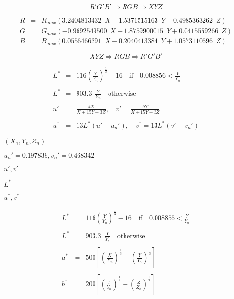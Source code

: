 \documentclass{article}
\begin{document}
\[ R'G'B' \Rightarrow RGB \Rightarrow XYZ \]
\pagebreak

\[ \begin{array}{rcl} R & = & R_{max} (3.2404813432\enspace X - 1.5371515163\enspace Y - 0.4985363262\enspace Z) \\ G & = & G_{max} (-0.9692549500\enspace X + 1.8759900015\enspace Y + 0.0415559266\enspace Z) \\ B & = & B_{max} (0.0556466391\enspace X - 0.2040413384\enspace Y + 1.0573110696\enspace Z) \end{array} \]
\pagebreak

\[ XYZ \Rightarrow RGB \Rightarrow R'G'B' \]
\pagebreak

\[ \begin{array}{rcl} L^{*} & = & 116 \left( \frac{Y}{Y_n} \right)^\frac{1}{3}-16 \quad \mbox{if} \quad 0.008856 < \frac{Y}{Y_n}\\ & & \\ L^{*} & = & 903.3\enspace \frac{Y}{Y_n} \quad \mbox{otherwise} \\ & & \\ u' & = & \frac{4 X}{X+15 Y + 3 Z}, \quad v' = \frac{9 Y}{X+15 Y + 3 Z}\\ & & \\ u^{*} & = & 13 L^{*} (u' - u_n'), \quad v^{*} = 13 L^{*} (v' - v_n') \end{array} \]
\pagebreak

$(X_n, Y_n, Z_n)$
\pagebreak

$u_n' = 0.197839, v_n'=0.468342$
\pagebreak

$u', v'$
\pagebreak

$L^{*}$
\pagebreak

$u^{*}, v^{*}$
\pagebreak

\[ \begin{array}{rcl} L^{*} & = & 116 \left( \frac{Y}{Y_n} \right)^\frac{1}{3}-16 \quad \mbox{if} \quad 0.008856 < \frac{Y}{Y_n}\\ & & \\ L^{*} & = & 903.3\enspace \frac{Y}{Y_n} \quad \mbox{otherwise} \\ & & \\ a^{*} & = & 500 \left[ \left( \frac{X}{X_n} \right)^\frac{1}{3} - \left( \frac{Y}{Y_n} \right)^\frac{1}{3} \right] \\ & & \\ b^{*} & = & 200 \left[ \left( \frac{Y}{Y_n} \right)^\frac{1}{3} - \left( \frac{Z}{Z_n} \right)^\frac{1}{3} \right] \\ \end{array} \]
\pagebreak
\end{document}
